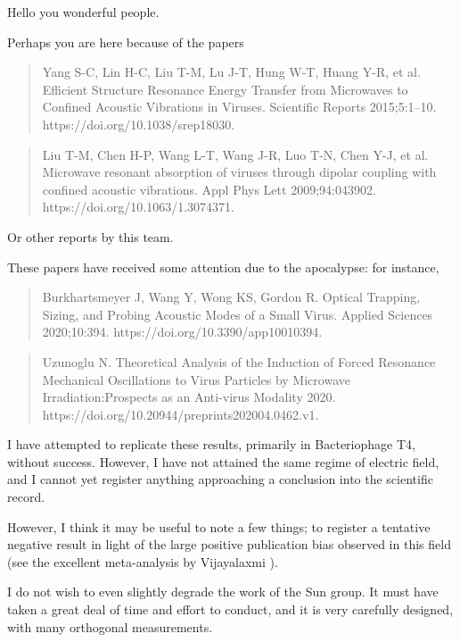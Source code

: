 \documentclass[fleqn,10pt]{paper}
\begin{document}
Hello you wonderful people.

Perhaps you are here because of the papers

\begin{quote}
	Yang S-C, Lin H-C, Liu T-M, Lu J-T, Hung W-T, Huang Y-R, et al. Efficient Structure Resonance Energy Transfer from Microwaves to Confined Acoustic Vibrations in Viruses. Scientific Reports 2015;5:1–10. https://doi.org/10.1038/srep18030.
\end{quote}

\begin{quote}
Liu T-M, Chen H-P, Wang L-T, Wang J-R, Luo T-N, Chen Y-J, et al. Microwave resonant absorption of viruses through dipolar coupling with confined acoustic vibrations. Appl Phys Lett 2009;94:043902. https://doi.org/10.1063/1.3074371.
\end{quote}

Or other reports by this team. 

These papers have received some attention due to the apocalypse: for instance,

\begin{quote}
	Burkhartsmeyer J, Wang Y, Wong KS, Gordon R. Optical Trapping, Sizing, and Probing Acoustic 
	Modes of a Small Virus. Applied Sciences 2020;10:394. https://doi.org/10.3390/app10010394.
\end{quote}


\begin{quote}
Uzunoglu N. Theoretical Analysis of the Induction of Forced Resonance Mechanical Oscillations to Virus Particles by Microwave Irradiation:Prospects as an Anti-virus Modality 2020. https://doi.org/10.20944/preprints202004.0462.v1.
\end{quote}


I have attempted to replicate these results, primarily in Bacteriophage T4, without success. 
However, I have not attained the same regime of electric field, and I cannot yet register anything 
approaching a conclusion into the scientific record.

However, I think it may be useful to note a few things; to register a tentative negative result in light of the large positive publication bias observed in this field (see the excellent meta-analysis by Vijayalaxmi \cite{Comprehensive2018}).

I do not wish to even slightly degrade the work of the Sun group. It must have taken a great deal of time and effort to conduct, and it is very carefully designed, with many orthogonal measurements.
\end{document}
